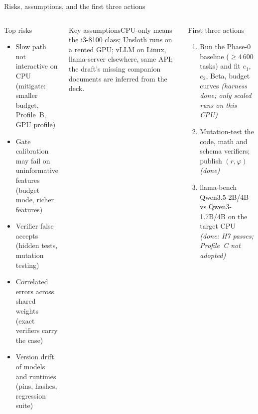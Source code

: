 \documentclass[aspectratio=169,10pt]{beamer}
\begin{document}
\begin{frame}{Risks, assumptions, and the first three actions}
\scriptsize
\begin{columns}[T]
\begin{alertblock}{Top risks}
\begin{itemize}\item Slow path not interactive on CPU (mitigate: smaller budget, Profile~B, GPU profile)\item Gate calibration may fail on uninformative features (budget mode, richer features)\item Verifier false accepts (hidden tests, mutation testing)\item Correlated errors across shared weights (exact verifiers carry the case)\item Version drift of models and runtimes (pins, hashes, regression suite)\end{itemize}
\end{alertblock}
\begin{block}{Key assumptions}CPU-only means the i3-8100 class; Unsloth runs on a rented GPU; vLLM on Linux, llama-server elsewhere, same API; the draft's missing companion documents are inferred from the deck.\end{block}
\begin{exampleblock}{First three actions}
\begin{enumerate}\item Run the Phase-0 baseline ($\ge4\,600$ tasks) and fit $e_1$, $e_2$, Beta, budget curves \emph{(harness done; only scaled runs on this CPU)}\item Mutation-test the code, math and schema verifiers; publish $(r,\varphi)$ \emph{(done)}\item llama-bench Qwen3.5-2B/4B vs Qwen3-1.7B/4B on the target CPU \emph{(done: H7 passes; Profile~C not adopted)}\end{enumerate}
\end{exampleblock}
\end{columns}
\end{frame}
\end{document}
